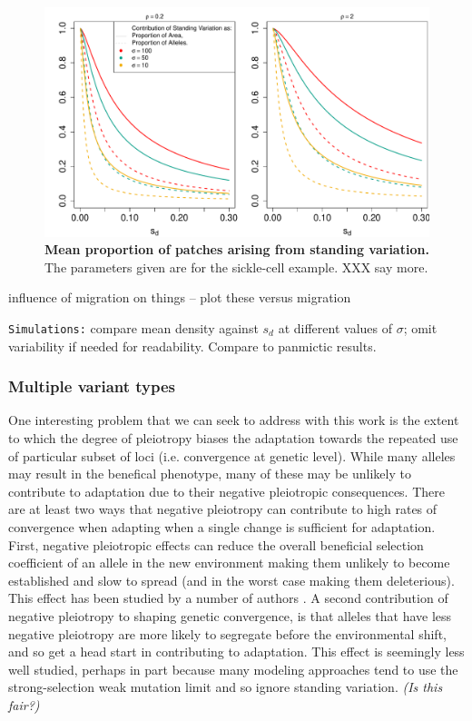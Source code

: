 \documentclass{article}
\newcommand{\gc}[1]{{\it\color{green}(#1)} }
\begin{document}
\begin{figure}[ht]
\begin{center}
  \includegraphics[width=1.0\textwidth]{G6PD_standing_var_proportion}
\caption{ %
{\bf Mean proportion of patches arising from standing variation.} The parameters given are for the sickle-cell example.  XXX say more.
} \label{G6PD_standing_var_proportion}
\end{center}
\end{figure}



influence of migration on things -- plot these versus migration 

{\tt Simulations:} compare mean density against $s_d$ at different values of $\sigma$; omit variability if needed for readability.
Compare to panmictic results.


\subsubsection{Multiple variant types}

One interesting problem that we can seek to address with this work is
the extent to which the degree of pleiotropy biases the 
adaptation towards the repeated use of particular subset of loci
(i.e. convergence at genetic level). 
While many alleles may result in the benefical phenotype, many of
these may be unlikely to contribute to adaptation due to their
negative pleiotropic consequences. There are at least two ways that
negative pleiotropy can contribute to high rates of
convergence when adapting when a single change is sufficient for
adaptation. 
First, negative pleiotropic effects can reduce the overall beneficial
selection coefficient of an allele in the new environment making them
unlikely to become established and slow to spread (and in the worst
case making them deleterious). This effect has been studied by a
number of authors \citep{}. A second contribution of negative
pleiotropy to shaping genetic convergence, is that alleles that have
less negative pleiotropy are more likely to segregate before the
environmental shift, and so get a head start in contributing to
adaptation. This effect is seemingly less well studied, perhaps in
part because many modeling approaches tend to use the strong-selection
weak mutation limit and so ignore standing variation. \gc{Is this fair?}
\end{document}
